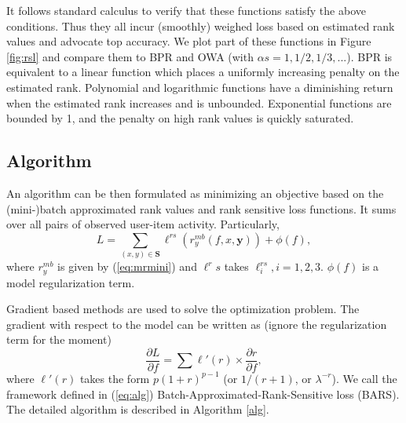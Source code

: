 \documentclass[letterpaper]{article} %
\begin{document}
It follows standard calculus to verify that these functions satisfy the above conditions. Thus they all incur (smoothly) weighed loss based on estimated rank values and advocate top accuracy. We plot part of these functions in Figure \ref{fig:rsl} and compare them to BPR and OWA (with ${\alpha}s=1, 1/2, 1/3, ...$). BPR is equivalent to a linear function which places a uniformly increasing penalty on the estimated rank. Polynomial and logarithmic functions have a diminishing return when the estimated rank increases and is unbounded. Exponential functions are bounded by 1, and the penalty on high rank values is quickly saturated.%

\subsection{Algorithm}
An algorithm can be then formulated as minimizing an objective based on the (mini-)batch approximated rank values and rank sensitive loss functions. It sums over all pairs of observed user-item activity. Particularly, 
\begin{equation}
\label{eq:alg}
L = \sum_{(x,y)\in \textbf{S}} \ell^{rs}(r^{mb}_y(f,x,\textbf{y})) + \phi(f),
\end{equation}
where $r_y^{mb}$ is given by (\ref{eq:mrmini}) and $\ell^rs$ takes $\ell^{rs}_i, i=1,2,3$. $\phi(f)$ is a model regularization term.

Gradient based methods are used to solve the optimization problem. The gradient with respect to the model can be written as (ignore the regularization term for the moment)
\begin{equation}
\label{eq:gradient}
\frac{\partial L}{\partial f} = \sum \ell'(r) \times \frac{\partial r}{\partial f},
\end{equation}
where $\ell'(r)$ takes the form $p(1+r)^{p-1}$ (or $1/(r+1)$, or $\lambda^{-r}$). We call the framework defined in (\ref{eq:alg}) Batch-Approximated-Rank-Sensitive loss (BARS). The detailed algorithm is described in Algorithm \ref{alg}.
\end{document}
